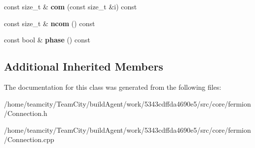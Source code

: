 \begin{DoxyCompactItemize}
\item 
const size\+\_\+t \& {\bfseries com} (const size\+\_\+t \&i) const \hypertarget{classAntisymConnection_a09288e7bcefd06caabefd93448322ff3}{}\label{classAntisymConnection_a09288e7bcefd06caabefd93448322ff3}

\item 
const size\+\_\+t \& {\bfseries ncom} () const \hypertarget{classAntisymConnection_a458ecaa28eb699e7b9594e73e81780be}{}\label{classAntisymConnection_a458ecaa28eb699e7b9594e73e81780be}

\item 
const bool \& {\bfseries phase} () const \hypertarget{classAntisymConnection_aefb3cefa46b0fe2c9b58f47d795ce1de}{}\label{classAntisymConnection_aefb3cefa46b0fe2c9b58f47d795ce1de}

\end{DoxyCompactItemize}
\subsection*{Additional Inherited Members}


The documentation for this class was generated from the following files\+:\begin{DoxyCompactItemize}
\item 
/home/teamcity/\+Team\+City/build\+Agent/work/5343cdffda4690e5/src/core/fermion/Connection.\+h\item 
/home/teamcity/\+Team\+City/build\+Agent/work/5343cdffda4690e5/src/core/fermion/Connection.\+cpp\end{DoxyCompactItemize}
